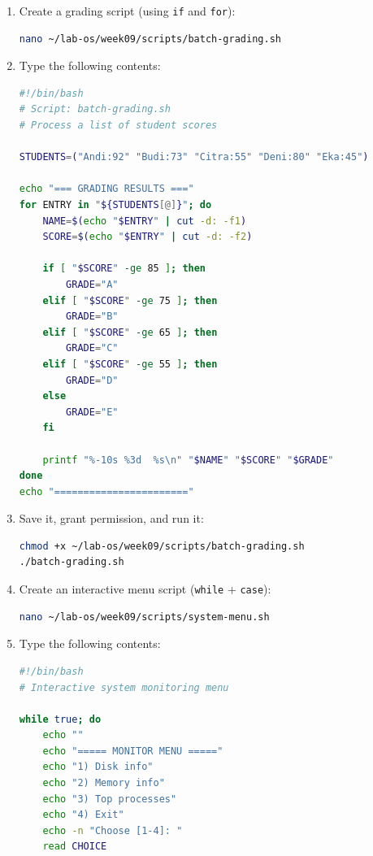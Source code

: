 \begin{enumerate}
  \item Create a grading script (using \texttt{if} and \texttt{for}):
\begin{lstlisting}[language=bash, caption={Creating batch-grading.sh}]
nano ~/lab-os/week09/scripts/batch-grading.sh
\end{lstlisting}

  \item Type the following contents:
\begin{lstlisting}[language=bash, caption={Contents of batch-grading.sh}]
#!/bin/bash
# Script: batch-grading.sh
# Process a list of student scores

STUDENTS=("Andi:92" "Budi:73" "Citra:55" "Deni:80" "Eka:45")

echo "=== GRADING RESULTS ==="
for ENTRY in "${STUDENTS[@]}"; do
    NAME=$(echo "$ENTRY" | cut -d: -f1)
    SCORE=$(echo "$ENTRY" | cut -d: -f2)

    if [ "$SCORE" -ge 85 ]; then
        GRADE="A"
    elif [ "$SCORE" -ge 75 ]; then
        GRADE="B"
    elif [ "$SCORE" -ge 65 ]; then
        GRADE="C"
    elif [ "$SCORE" -ge 55 ]; then
        GRADE="D"
    else
        GRADE="E"
    fi

    printf "%-10s %3d  %s\n" "$NAME" "$SCORE" "$GRADE"
done
echo "======================="
\end{lstlisting}

  \item Save it, grant permission, and run it:
\begin{lstlisting}[language=bash, caption={Running the grading script}]
chmod +x ~/lab-os/week09/scripts/batch-grading.sh
./batch-grading.sh
\end{lstlisting}

  \item Create an interactive menu script (\texttt{while} + \texttt{case}):
\begin{lstlisting}[language=bash, caption={Creating system-menu.sh}]
nano ~/lab-os/week09/scripts/system-menu.sh
\end{lstlisting}

  \item Type the following contents:
\begin{lstlisting}[language=bash, caption={Contents of system-menu.sh}]
#!/bin/bash
# Interactive system monitoring menu

while true; do
    echo ""
    echo "===== MONITOR MENU ====="
    echo "1) Disk info"
    echo "2) Memory info"
    echo "3) Top processes"
    echo "4) Exit"
    echo -n "Choose [1-4]: "
    read CHOICE


\end{lstlisting}
\end{enumerate}
